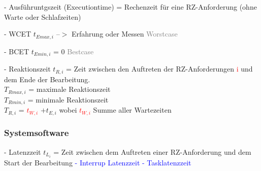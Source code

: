 \documentclass[12pt,a4paper,oneside,ngerman]{article}
\begin{document}
\begin{description}
\item - Ausführuntgszeit (Executiontime) = Rechenzeit für eine RZ-Anforderung (ohne Warte oder Schlafzeiten)	
	\begin{description}
		\item - WCET \(t_{Emax,i}\) --$>$ Erfahrung oder Messen \textcolor{gray}{Worstcase}
		\item - BCET \(t_{Emin,i}\) = 0 \textcolor{gray}{Bestcase}
	\end{description}
\end{description}


- Reaktionszeit \(t_{R,i}\) = Zeit zwischen den Auftreten der RZ-Anforderungen \textcolor{red}{i} und dem Ende der Bearbeitung. \\

\(T_{Rmax,i}\) = maximale Reaktionszeit \\
\(T_{Rmin,i}\) = minimale Reaktionszeit \\
\(T_{R,i}\) = \textcolor{red}{\(t_{W,i}\)} \(+ t_{E,i}\) wobei \textcolor{red}{ \(t_{W,i}\) } Summe aller Wartezeiten

\subsubsection{Systemsoftware}

- Latenzzeit \(t_{L_i}\) = Zeit zwischen dem Auftreten einer RZ-Anforderung und dem Start der Bearbeitung
\textcolor{blue}{
	- Interrup Latenzzeit
	- Tasklatenzzeit
}
\end{document}
